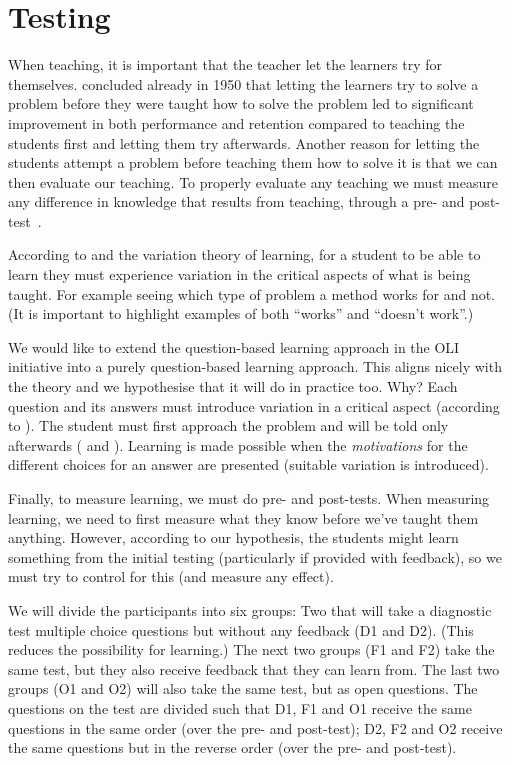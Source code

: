 \section{Testing}

When teaching, it is important that the teacher let the learners try for 
themselves.
\Textcite{Szekely1950} concluded already in 1950 that letting the learners try 
to solve a problem before they were taught how to solve the problem led to 
significant improvement in both performance and retention compared to teaching 
the students first and letting them try afterwards.
Another reason for letting the students attempt a problem before teaching them 
how to solve it is that we can then evaluate our teaching.
To properly evaluate any teaching we must measure any difference in knowledge 
that results from teaching, through a pre- and 
post-test~\parencite{NecessaryConditionsOfLearning}.

According to \textcite{NecessaryConditionsOfLearning} and the variation theory 
of learning, for a student to be able to learn they must experience variation 
in the critical aspects of what is being taught.
For example seeing which type of problem a method works for and not.
(It is important to highlight examples of both \enquote{works} and 
\enquote{doesn't work}.)

We would like to extend the question-based learning approach in the OLI 
initiative into a purely question-based learning approach.
This aligns nicely with the theory and we hypothesise that it will do in 
practice too.
Why?
Each question and its answers must introduce variation in a critical aspect 
(according to \cite{NecessaryConditionsOfLearning}).
The student must first approach the problem and will be told only afterwards 
(\cite{Szekely1950} and \cite{NecessaryConditionsOfLearning}).
Learning is made possible when the \emph{motivations} for the different choices 
for an answer are presented (suitable variation is introduced).

Finally, to measure learning, we must do pre- and post-tests.
When measuring learning, we need to first measure what they know before we've 
taught them anything.
However, according to our hypothesis, the students might learn something from 
the initial testing (particularly if provided with feedback), so we must try to 
control for this (and measure any effect).

We will divide the participants into six groups:
Two that will take a diagnostic test multiple choice questions but without any 
feedback (D1 and D2).
(This reduces the possibility for learning.)
The next two groups (F1 and F2) take the same test, but they also receive 
feedback that they can learn from.
The last two groups (O1 and O2) will also take the same test, but as open 
questions.
The questions on the test are divided such that D1, F1 and O1 receive the same 
questions in the same order (over the pre- and post-test); D2, F2 and O2 
receive the same questions but in the reverse order (over the pre- and 
post-test).


